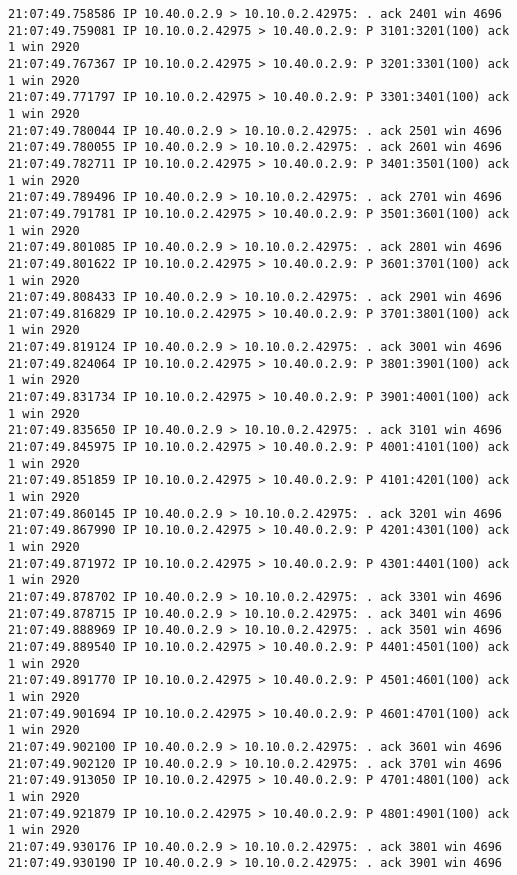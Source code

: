 \documentclass[a4paper,12pt]{article}
\begin{document}
\begin{Verbatim}
21:07:49.758586 IP 10.40.0.2.9 > 10.10.0.2.42975: . ack 2401 win 4696 
21:07:49.759081 IP 10.10.0.2.42975 > 10.40.0.2.9: P 3101:3201(100) ack 1 win 2920 
21:07:49.767367 IP 10.10.0.2.42975 > 10.40.0.2.9: P 3201:3301(100) ack 1 win 2920 
21:07:49.771797 IP 10.10.0.2.42975 > 10.40.0.2.9: P 3301:3401(100) ack 1 win 2920 
21:07:49.780044 IP 10.40.0.2.9 > 10.10.0.2.42975: . ack 2501 win 4696 
21:07:49.780055 IP 10.40.0.2.9 > 10.10.0.2.42975: . ack 2601 win 4696 
21:07:49.782711 IP 10.10.0.2.42975 > 10.40.0.2.9: P 3401:3501(100) ack 1 win 2920 
21:07:49.789496 IP 10.40.0.2.9 > 10.10.0.2.42975: . ack 2701 win 4696 
21:07:49.791781 IP 10.10.0.2.42975 > 10.40.0.2.9: P 3501:3601(100) ack 1 win 2920 
21:07:49.801085 IP 10.40.0.2.9 > 10.10.0.2.42975: . ack 2801 win 4696 
21:07:49.801622 IP 10.10.0.2.42975 > 10.40.0.2.9: P 3601:3701(100) ack 1 win 2920 
21:07:49.808433 IP 10.40.0.2.9 > 10.10.0.2.42975: . ack 2901 win 4696 
21:07:49.816829 IP 10.10.0.2.42975 > 10.40.0.2.9: P 3701:3801(100) ack 1 win 2920 
21:07:49.819124 IP 10.40.0.2.9 > 10.10.0.2.42975: . ack 3001 win 4696 
21:07:49.824064 IP 10.10.0.2.42975 > 10.40.0.2.9: P 3801:3901(100) ack 1 win 2920 
21:07:49.831734 IP 10.10.0.2.42975 > 10.40.0.2.9: P 3901:4001(100) ack 1 win 2920 
21:07:49.835650 IP 10.40.0.2.9 > 10.10.0.2.42975: . ack 3101 win 4696 
21:07:49.845975 IP 10.10.0.2.42975 > 10.40.0.2.9: P 4001:4101(100) ack 1 win 2920 
21:07:49.851859 IP 10.10.0.2.42975 > 10.40.0.2.9: P 4101:4201(100) ack 1 win 2920 
21:07:49.860145 IP 10.40.0.2.9 > 10.10.0.2.42975: . ack 3201 win 4696 
21:07:49.867990 IP 10.10.0.2.42975 > 10.40.0.2.9: P 4201:4301(100) ack 1 win 2920 
21:07:49.871972 IP 10.10.0.2.42975 > 10.40.0.2.9: P 4301:4401(100) ack 1 win 2920 
21:07:49.878702 IP 10.40.0.2.9 > 10.10.0.2.42975: . ack 3301 win 4696 
21:07:49.878715 IP 10.40.0.2.9 > 10.10.0.2.42975: . ack 3401 win 4696 
21:07:49.888969 IP 10.40.0.2.9 > 10.10.0.2.42975: . ack 3501 win 4696 
21:07:49.889540 IP 10.10.0.2.42975 > 10.40.0.2.9: P 4401:4501(100) ack 1 win 2920 
21:07:49.891770 IP 10.10.0.2.42975 > 10.40.0.2.9: P 4501:4601(100) ack 1 win 2920 
21:07:49.901694 IP 10.10.0.2.42975 > 10.40.0.2.9: P 4601:4701(100) ack 1 win 2920 
21:07:49.902100 IP 10.40.0.2.9 > 10.10.0.2.42975: . ack 3601 win 4696 
21:07:49.902120 IP 10.40.0.2.9 > 10.10.0.2.42975: . ack 3701 win 4696 
21:07:49.913050 IP 10.10.0.2.42975 > 10.40.0.2.9: P 4701:4801(100) ack 1 win 2920 
21:07:49.921879 IP 10.10.0.2.42975 > 10.40.0.2.9: P 4801:4901(100) ack 1 win 2920 
21:07:49.930176 IP 10.40.0.2.9 > 10.10.0.2.42975: . ack 3801 win 4696 
21:07:49.930190 IP 10.40.0.2.9 > 10.10.0.2.42975: . ack 3901 win 4696 

\end{Verbatim}
\end{document}
